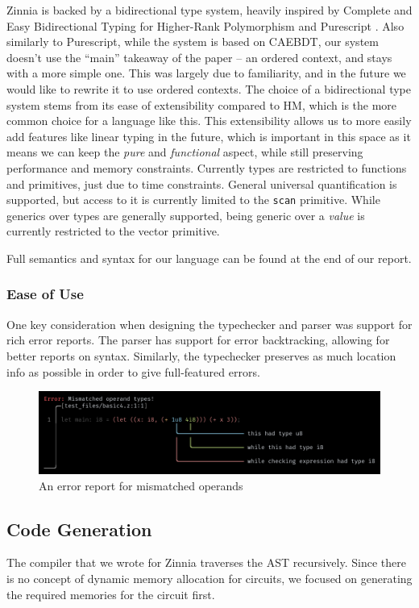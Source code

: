 \documentclass[12pt]{article}
\begin{document}
Zinnia is backed by a bidirectional type system, heavily inspired by Complete and Easy Bidirectional Typing for Higher-Rank Polymorphism and Purescript \cite{dunfield_complete_2013}. Also similarly to Purescript, while the system is based on CAEBDT, our system doesn't use the ``main'' takeaway of the paper -- an ordered context, and stays with a more simple one. This was largely due to familiarity, and in the future we would like to rewrite it to use ordered contexts. The choice of a bidirectional type system stems from its ease of extensibility compared to HM, which is the more common choice for a language like this. This extensibility allows us to more easily add features like linear typing in the future, which is important in this space as it means we can keep the \textit{pure} and \textit{functional} aspect, while still preserving performance and memory constraints. Currently types are restricted to functions and primitives, just due to time constraints. General universal quantification is supported, but access to it is currently limited to the \texttt{scan} primitive. While generics over types are generally supported, being generic over a \textit{value} is currently restricted to the vector primitive.

Full semantics and syntax for our language can be found at the end of our report.

\subsubsection{Ease of Use}
One key consideration when designing the typechecker and parser was support for rich error reports. The parser has support for error backtracking, allowing for better reports on syntax. Similarly, the typechecker preserves as much location info as possible in order to give full-featured errors.

\begin{figure}[h]
    \includegraphics[width=\linewidth]{err.png}
    \caption{An error report for mismatched operands}
\end{figure}

\subsection{Code Generation}
The compiler that we wrote for Zinnia traverses the AST recursively. Since there is no concept of dynamic
memory allocation for circuits, we focused on generating the required memories for the circuit first.
\end{document}
